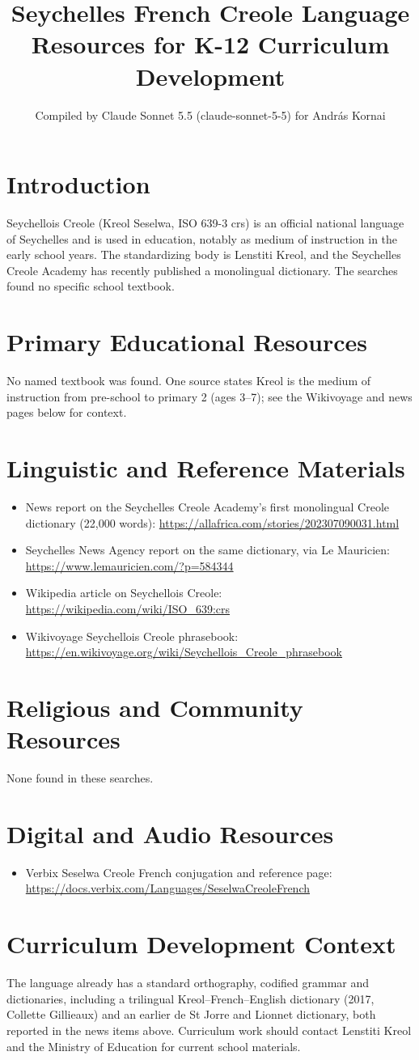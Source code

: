 \documentclass[12pt]{article}
\title{Seychelles French Creole Language Resources for K-12 Curriculum Development}
\author{Compiled by Claude Sonnet 5.5 (claude-sonnet-5-5) for Andr\'as Kornai}
\date{}
\begin{document}
\maketitle
\section{Introduction}
Seychellois Creole (Kreol Seselwa, ISO 639-3 crs) is an official national language of Seychelles and is used in education, notably as medium of instruction in the early school years. The standardizing body is Lenstiti Kreol, and the Seychelles Creole Academy has recently published a monolingual dictionary. The searches found no specific school textbook.
\section{Primary Educational Resources}
No named textbook was found. One source states Kreol is the medium of instruction from pre-school to primary 2 (ages 3--7); see the Wikivoyage and news pages below for context.
\section{Linguistic and Reference Materials}
\begin{itemize}
\item News report on the Seychelles Creole Academy's first monolingual Creole dictionary (22,000 words): \url{https://allafrica.com/stories/202307090031.html}
\item Seychelles News Agency report on the same dictionary, via Le Mauricien: \url{https://www.lemauricien.com/?p=584344}
\item Wikipedia article on Seychellois Creole: \url{https://wikipedia.com/wiki/ISO_639:crs}
\item Wikivoyage Seychellois Creole phrasebook: \url{https://en.wikivoyage.org/wiki/Seychellois_Creole_phrasebook}
\end{itemize}
\section{Religious and Community Resources}
None found in these searches.
\section{Digital and Audio Resources}
\begin{itemize}
\item Verbix Seselwa Creole French conjugation and reference page: \url{https://docs.verbix.com/Languages/SeselwaCreoleFrench}
\end{itemize}
\section{Curriculum Development Context}
The language already has a standard orthography, codified grammar and dictionaries, including a trilingual Kreol--French--English dictionary (2017, Collette Gillieaux) and an earlier de St Jorre and Lionnet dictionary, both reported in the news items above. Curriculum work should contact Lenstiti Kreol and the Ministry of Education for current school materials.
\end{document}
